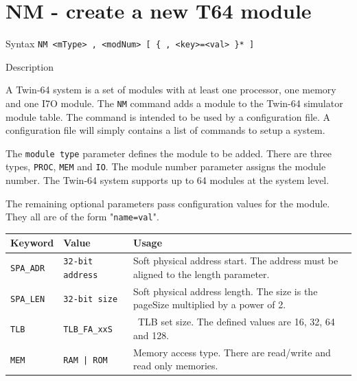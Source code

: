 %
%
\pagebreak
\section*{NM - create a new T64 module}

\begin{iPageDescEntry}{Syntax}
\texttt{NM <mType> , <modNum>  [ \{ , <key>=<val> \}* ] } \\
\end{iPageDescEntry}

\begin{iPageDescEntry}{Description}

A Twin-64 system is a set of modules with at least one processor, one memory and one I7O module. The \texttt{NM} command adds a module to the Twin-64 simulator module table. The command is intended to be used by a configuration file. A configuration file will simply contains a list of commands to setup a system. 

The \texttt{module type} parameter defines the module to be added. There are three types, \texttt{PROC}, \texttt{MEM} and \texttt{IO}. The module number parameter assigns the module number. The Twin-64 system supports up to 64 modules at the system level. 

The remaining optional parameters pass configuration values for the module. They all are of the form "\texttt{name=val}". 

\begin{flushleft}
\begin{tabularx}{\linewidth}{|l|l|X|}
\hline
\textbf{Keyword}  & \textbf{Value} & \textbf{Usage} \\ \hline
\texttt{SPA\_ADR} & \texttt{32-bit address} & Soft physical address start. The address must be aligned to the length parameter. \\ \hline
\texttt{SPA\_LEN} & \texttt{32-bit size} & Soft physical address length. The size is the pageSize multiplied by a power of 2.\\ \hline
\texttt{TLB} & \texttt{TLB\_FA\_xxS} & \ TLB set size. The defined values are 16, 32, 64 and 128. \\ \hline
\texttt{MEM} & \texttt{RAM | ROM} & Memory access type. There are read/write and read only memories. \\ \hline
\end{tabularx}
\end{flushleft}

\end{iPageDescEntry}

